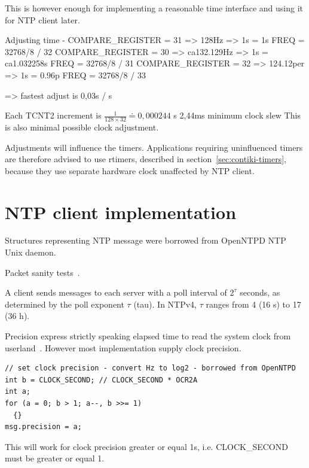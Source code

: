 
This is however enough for implementing a reasonable time interface and using it for NTP client later.



Adjusting time - COMPARE\_REGISTER = 31 => 128Hz => 1s = 1s
FREQ = 32768/8 / 32
COMPARE\_REGISTER = 30 => ca132.129Hz => 1s = ca1.032258s
FREQ = 32768/8 / 31
COMPARE\_REGISTER = 32 => 124.12per => 1s = 0.96p
FREQ = 32768/8 / 33

=> fastest adjust is 0,03s / s


Each TCNT2 increment is $\frac{1}{128 \times 32} \doteq 0,000244$ s
2,44ms minimum clock slew
This is also minimal possible clock adjustment.


Adjustments will influence the timers.
Applications requiring uninfluenced timers
are therefore advised to use rtimers, described in section~\ref{sec:contiki-timers},
because they use separate hardware clock
unaffected by NTP client.



\section{NTP client implementation}
Structures representing NTP message were borrowed from OpenNTPD NTP Unix daemon.

Packet sanity tests~\cite{ntp-arch}.

A client sends messages to each server with a poll interval of $2^{\tau}$
seconds, as determined by the poll exponent $\tau$ (tau).
In NTPv4, $\tau$ ranges from 4 (16 s) to 17 (36 h).


Precision express strictly speaking elapsed time to read the system clock from userland~\cite{ntp-arch}.
However most implementation supply clock precision.
\begin{lstlisting}
// set clock precision - convert Hz to log2 - borrowed from OpenNTPD
int b = CLOCK_SECOND; // CLOCK_SECOND * OCR2A
int a;
for (a = 0; b > 1; a--, b >>= 1)
  {}
msg.precision = a;
\end{lstlisting}
This will work for clock precision greater or equal 1s, i.e. CLOCK\_SECOND must be greater or equal 1.

